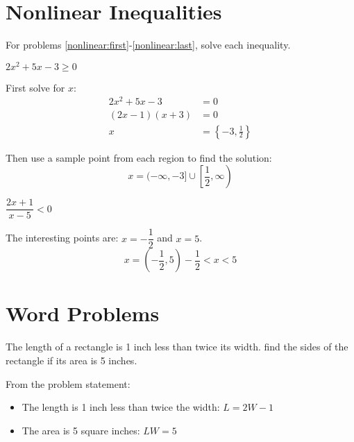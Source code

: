 \documentclass[fleqn,addpoints]{exam}
\begin{document}
\begin{questions}



\section{Nonlinear Inequalities}

For problems \ref{nonlinear:first}-\ref{nonlinear:last}, solve each inequality.

\question[10] \( 2x^2 + 5x - 3 \geq 0 \)
\label{nonlinear:first}
\begin{solution}[6 cm]
First solve for $x$:
\begin{align*}
  2x^2 + 5x - 3 &= 0 \\
  (2x-1)(x+3) &= 0 \\
  x &= \left \{ -3, \frac{1}{2} \right \}
\end{align*}

Then use a sample point from each region to find the solution:
\[
 x = (-\infty, -3] \cup \left[ \frac{1}{2}, \infty \right )
\]
\end{solution}

\question[10] \( \dfrac{2x+1}{x-5} < 0 \)
\label{nonlinear:last}
\begin{solution}[6 cm]
The interesting points are: $x = - \dfrac{1}{2}$ and $x = 5$.
\[
  x = \left( - \frac{1}{2}, 5 \right)- \frac{1}{2} < x < 5
\]
\end{solution}


\section{Word Problems}

\question[10] 
The length of a rectangle is 1 inch less than twice its width.  find the sides of the rectangle if its area is 5 inches.
\begin{solution}[9 cm]
From the problem statement:
\begin{itemize}
  \item The length is 1 inch less than twice the width: $L = 2W - 1$
  \item The area is 5 square inches: $LW=5$
\end{itemize}


\end{solution}
\end{questions}
\end{document}
